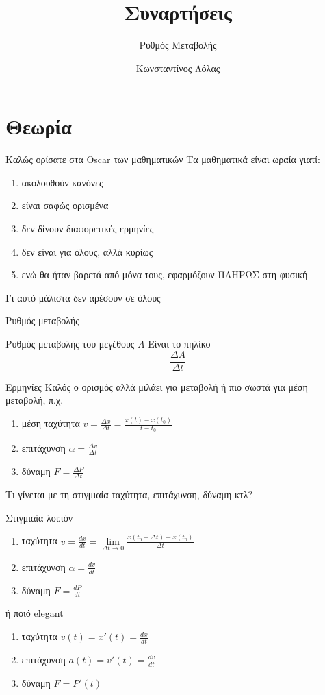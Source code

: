 \documentclass[greek]{beamer}
\title{Συναρτήσεις}
\subtitle{Ρυθμός Μεταβολής}
\author[Λόλας]{Κωνσταντίνος Λόλας}
\date{}
\begin{document}
\begin{frame}
 \titlepage
\end{frame}

\section{Θεωρία}
\begin{frame}{Καλώς ορίσατε στα Oscar των μαθηματικών}
 Τα μαθηματικά είναι ωραία γιατί:
 \begin{enumerate}
  \item<1-> ακολουθούν κανόνες
  \item<2-> είναι σαφώς ορισμένα
  \item<3-> δεν δίνουν διαφορετικές ερμηνίες
  \item<4-> δεν είναι για όλους, αλλά κυρίως
  \item<5-> ενώ θα ήταν βαρετά από μόνα τους, εφαρμόζουν ΠΛΗΡΩΣ στη φυσική
 \end{enumerate}
  Γι αυτό μάλιστα δεν αρέσουν σε όλους
\end{frame}

\begin{frame}{Ρυθμός μεταβολής}
 \begin{block}{Ρυθμός μεταβολής του μεγέθους $A$}
  Είναι το πηλίκο
  $$\frac{ΔA}{Δt}$$
 \end{block}
\end{frame}

\begin{frame}{Ερμηνίες}
 Καλός ο ορισμός αλλά μιλάει για μεταβολή ή πιο σωστά για μέση μεταβολή, π.χ.
 \begin{enumerate}
  \item<1-> μέση ταχύτητα $v=\frac{Δx}{Δt}=\frac{x(t)-x(t_0)}{t-t_0}$
  \item<2-> επιτάχυνση $α=\frac{Δv}{Δt}$
  \item<3-> δύναμη $F=\frac{ΔP}{Δt}$
 \end{enumerate}
  Τι γίνεται με τη στιγμιαία ταχύτητα, επιτάχυνση, δύναμη κτλ?
\end{frame}

\begin{frame}{Στιγμιαία λοιπόν}
 \begin{enumerate}
  \item<1-> ταχύτητα $v=\frac{dx}{dt}=\lim\limits_{Δt \to 0}{ \frac{x(t_0+Δt) - x(t_0)}{Δt} }$
  \item<2-> επιτάχυνση $α=\frac{dv}{dt}$
  \item<3-> δύναμη $F=\frac{dP}{dt}$
 \end{enumerate}
  ή ποιό elegant
 \begin{enumerate}
  \item<5-> ταχύτητα $v(t)=x'(t)=\frac{dx}{dt}$
  \item<6-> επιτάχυνση $a(t)=v'(t)=\frac{dv}{dt}$
  \item<7-> δύναμη $F=P'(t)$
 \end{enumerate}
\end{frame}
\end{document}
